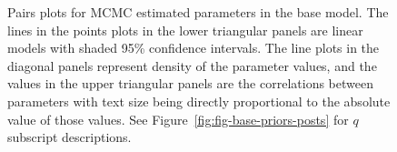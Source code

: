 \documentclass[11pt]{book}
\begin{document}
\begin{figure}[H]

{\centering {} 

}

\caption{Pairs plots for MCMC estimated parameters in the base model. The lines in the points plots in the lower triangular panels are linear models with shaded 95\% confidence intervals. The line plots in the diagonal panels represent density of the parameter values, and the values in the upper triangular panels are the correlations between parameters with text size being directly proportional to the absolute value of those values. See Figure~\ref{fig:fig-base-priors-posts} for \(q\) subscript descriptions.}\label{fig:fig-base-pairs}
\end{figure}
\end{document}
